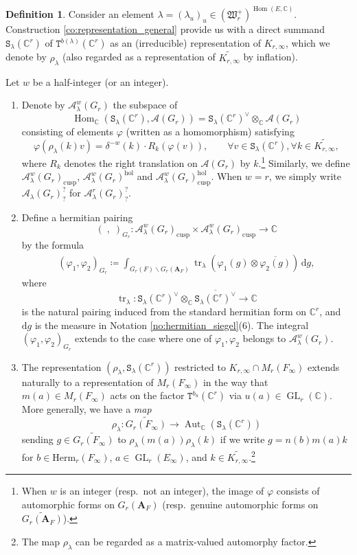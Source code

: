 \documentclass[12pt]{amsart}
\numberwithin{equation}{section}
\theoremstyle{plain}
\theoremstyle{definition}
\newtheorem{definition}[proposition]{Definition}
\theoremstyle{remark}
\renewcommand{\b}[1]{\mathbf{#1}}
\renewcommand{\c}[1]{\mathcal{#1}}
\renewcommand{\d}[1]{\mathbb{#1}}
\newcommand{\f}[1]{\mathfrak{#1}}
\renewcommand{\r}[1]{\mathrm{#1}}
\renewcommand{\(}{\left(}
\renewcommand{\)}{\right)}
\newcommand{\ol}[1]{\overline{#1}{}}
\newcommand{\bA}{\b A}
\newcommand{\cA}{\c A}
\newcommand{\dC}{\d C}
\newcommand{\fW}{\f W}
\newcommand{\rd}{\,\r d}
\newcommand{\tS}{\mathtt{S}}
\newcommand{\tT}{\mathtt{T}}
\newcommand{\cusp}{\r{cusp}}
\newcommand{\Herm}{\r{Herm}}
\newcommand{\hol}{\r{hol}}
\DeclareMathOperator{\Aut}{Aut}
\DeclareMathOperator{\GL}{GL}
\DeclareMathOperator{\Hom}{Hom}
\DeclareMathOperator{\tr}{tr}
\begin{document}
\begin{definition}\label{de:hermitian_siegel}
Consider an element $\lambda=(\lambda_u)_u\in(\fW_r^+)^{\Hom(E,\dC)}$. Construction \ref{co:representation_general} provide us with a direct summand $\tS_\lambda(\dC^r)$ of $\tT^{b(\lambda)}(\dC^r)$ as an (irreducible) representation of $K_{r,\infty}$, which we denote by $\rho_\lambda$ (also regarded as a representation of $\widetilde{K_{r,\infty}}$ by inflation).

Let $w$ be a half-integer (or an integer).
\begin{enumerate}
  \item Denote by $\cA^w_\lambda(G_r)$ the subspace of
      \[
      \Hom_\dC\(\tS_\lambda(\dC^r),\cA(G_r)\)=\tS_\lambda(\dC^r)^\vee\otimes_\dC\cA(G_r)
      \]
      consisting of elements $\varphi$ (written as a homomorphism) satisfying
      \[
      \varphi(\rho_\lambda(k)v)=\delta^{-w}(k)\cdot R_k(\varphi(v)),\qquad\forall v\in \tS_\lambda(\dC^r),\forall k\in\widetilde{K_{r,\infty}},
      \]
      where $R_k$ denotes the right translation on $\cA(G_r)$ by $k$.\footnote{When $w$ is an integer (resp.\ not an integer), the image of $\varphi$ consists of automorphic forms on $G_r(\bA_F)$ (resp.\ genuine automorphic forms on $\widetilde{G_r(\bA_F)}$).} Similarly, we define $\cA^w_\lambda(G_r)_\cusp$, $\cA^w_\lambda(G_r)^\hol$ and $\cA^w_\lambda(G_r)_\cusp^\hol$. When $w=r$, we simply write $\cA_\lambda(G_r)^?_?$ for $\cA^r_\lambda(G_r)^?_?$.

  \item Define a hermitian pairing
    \[
    (\;,\;)_{G_r}\colon\cA^w_\lambda(G_r)_\cusp\times\cA^w_\lambda(G_r)_\cusp\to\dC
    \]
    by the formula
    \begin{align*}
    (\varphi_1,\varphi_2)_{G_r}\coloneqq\int_{G_r(F)\backslash G_r(\bA_F)}
    \tr_\lambda\(\varphi_1(g)\otimes\ol{\varphi_2(g)}\)\rd g,
    \end{align*}
    where
    \[
    \tr_\lambda\colon\tS_\lambda(\dC^r)^\vee\otimes_\dC\ol{\tS_\lambda(\dC^r)^\vee}\to\dC
    \]
    is the natural pairing induced from the standard hermitian form on $\dC^r$, and $\r{d}g$ is the measure in Notation \ref{no:hermitian_siegel}(6). The integral $(\varphi_1,\varphi_2)_{G_r}$ extends to the case where one of $\varphi_1,\varphi_2$ belongs to $\cA^w_\lambda(G_r)$.

  \item The representation $(\rho_\lambda,\tS_\lambda(\dC^r))$ restricted to $K_{r,\infty}\cap M_r(F_\infty)$ extends naturally to a representation of $M_r(F_\infty)$ in the way that $m(a)\in M_r(F_\infty)$ acts on the factor $\tT^{b_u}(\dC^r)$ via $u(a)\in\GL_r(\dC)$. More generally, we have a \emph{map}
      \[
      \rho_\lambda\colon\widetilde{G_r(F_\infty)}\to\Aut_\dC(\tS_\lambda(\dC^r))
      \]
      sending $g\in\widetilde{G_r(F_\infty)}$ to $\rho_\lambda(m(a))\rho_\lambda(k)$ if we write $g=n(b)m(a)k$ for $b\in\Herm_r(F_\infty)$, $a\in\GL_r(E_\infty)$, and $k\in\widetilde{K_{r,\infty}}$.\footnote{The map $\rho_\lambda$ can be regarded as a matrix-valued automorphy factor.}
\end{enumerate}
\end{definition}
\end{document}
